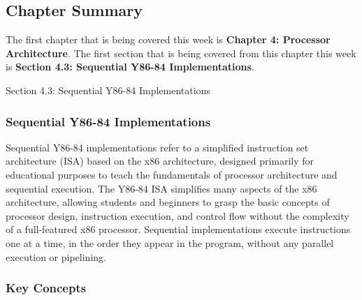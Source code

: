 \subsection{Chapter Summary}

The first chapter that is being covered this week is \textbf{Chapter 4: Processor Architecture}. The first section that is being covered from this chapter this week is \textbf{Section 4.3: Sequential Y86-84 Implementations}.

\begin{notes}{Section 4.3: Sequential Y86-84 Implementations}
    \subsubsection*{Sequential Y86-84 Implementations}

    Sequential Y86-84 implementations refer to a simplified instruction set architecture (ISA) based on the x86 architecture, designed primarily for educational purposes to teach the fundamentals of 
    processor architecture and sequential execution. The Y86-84 ISA simplifies many aspects of the x86 architecture, allowing students and beginners to grasp the basic concepts of processor design, 
    instruction execution, and control flow without the complexity of a full-featured x86 processor. Sequential implementations execute instructions one at a time, in the order they appear in the 
    program, without any parallel execution or pipelining. \vspace*{1em}
    
    \subsubsection*{Key Concepts}
    

\end{notes}
